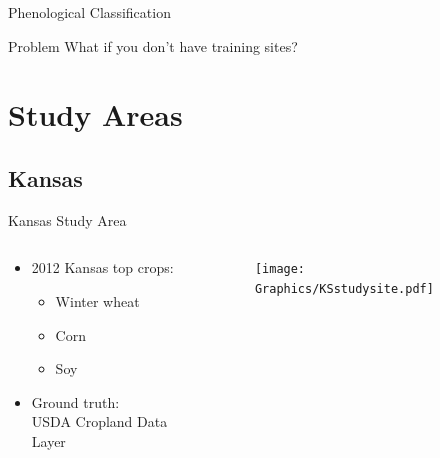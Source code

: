 \documentclass[  compress,xcolor={usenames,dvipsnames}]{beamer}
\begin{document}
\begin{frame}{Phenological Classification}
\begin{alertblock}{Problem}
  What if you don’t have training sites?
\end{alertblock}
\end{frame}


\section{Study Areas}

\subsection{Kansas}
\begin{frame}{Kansas Study Area}
\begin{columns}[onlytextwidth]
\begin{column}{0.47\textwidth}
  \begin{itemize}
    \item 2012 Kansas top crops:
      \begin{itemize}
        \item Winter wheat
        \item Corn
        \item Soy
      \end{itemize}
    \item Ground truth:\\USDA Cropland Data Layer
  \end{itemize}
\end{column}
\begin{column}{0.53\textwidth}
  \begin{figure}
    \texttt{[image: Graphics/KSstudysite.pdf]}
  \end{figure}
\end{column}
\end{columns}
\end{frame}
\end{document}
